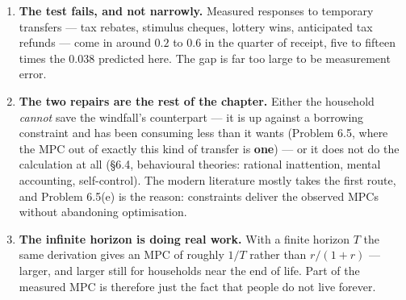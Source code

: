 \documentclass[12pt, letterpaper]{article}
\begin{document}
\begin{tcolorbox}[evenbox,title={Problem 6.8 \quad The Marginal Propensity to Consume}]
\begin{enumerate}[label=\textbf{\arabic*.},leftmargin=1.6em,itemsep=4pt,topsep=3pt]
\item \textbf{The test fails, and not narrowly.} Measured responses to temporary transfers
--- tax rebates, stimulus cheques, lottery wins, anticipated tax refunds --- come in around
$0.2$ to $0.6$ in the quarter of receipt, five to fifteen times the $0.038$ predicted here.
The gap is far too large to be measurement error.

\item \textbf{The two repairs are the rest of the chapter.} Either the household \emph{cannot}
save the windfall's counterpart --- it is up against a borrowing constraint and has been
consuming less than it wants (Problem 6.5, where the MPC out of exactly this kind of transfer
is \textbf{one}) --- or it does not do the calculation at all (\S6.4, behavioural theories:
rational inattention, mental accounting, self-control). The modern literature mostly takes
the first route, and Problem 6.5(e) is the reason: constraints deliver the observed MPCs
without abandoning optimisation.

\item \textbf{The infinite horizon is doing real work.} With a finite horizon $T$ the same
derivation gives an MPC of roughly $1/T$ rather than $r/(1+r)$ --- larger, and larger still
for households near the end of life. Part of the measured MPC is therefore just the fact
that people do not live forever.
\end{enumerate}
\end{tcolorbox}
\end{document}
